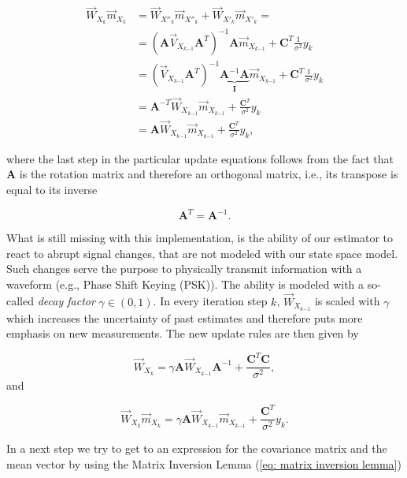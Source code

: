 \documentclass[11pt,a4paper,twoside]{report}
\newcommand{\messF}[3]{\overrightarrow{#1}_{{#2}_{k{#3}}}}
\newcommand{\mat}[1]{\mathbf{#1}}
\begin{document}
\begin{align}
  \label{eq: weighted mean}
  \messF{W}{X}{}\messF{m}{X}{} &= \messF{W}{X''}{}\messF{m}{X''}{} + \messF{W}{X'}{}\messF{m}{X'}{} = \\
  &= \left(\mat{A}\messF{V}{X}{-1}\mat{A}^T\right)^{-1}\mat{A}\messF{m}{X}{-1} + \mat{C}^T\frac{1}{\sigma^2}y_k \\
  &= \left(\messF{V}{X}{-1}\mat{A}^T\right)^{-1}\underbrace{\mat{A}^{-1}\mat{A}}_{\mat{I}}\messF{m}{X}{-1} + \mat{C}^T\frac{1}{\sigma^2}y_k \\
  &= \mat{A}^{-T}\messF{W}{X}{-1}\messF{m}{X}{-1} + \frac{\mat{C}^T}{\sigma^2}y_k \\
  &= \mat{A}\messF{W}{X}{-1}\messF{m}{X}{-1} + \frac{\mat{C}^T}{\sigma^2}y_k,
\end{align}

where the last step in the particular update equations follows from the fact that $\mat{A}$ is the rotation matrix and therefore an orthogonal matrix, i.e., its transpose is equal to its inverse

\begin{equation*}
	\mat{A}^T = \mat{A}^{-1}.
\end{equation*}

What is still missing with this implementation, is the ability of our estimator to react to abrupt signal changes, that are not modeled with our state space model. Such changes serve the purpose to physically transmit information with a waveform (e.g., Phase Shift Keying (PSK)). The ability is modeled with a so-called \emph{decay factor} $\gamma \in (0,1)$. In every iteration step $k$, $\messF{W}{X}{-1}$ is scaled with $\gamma$ which increases the uncertainty of  past estimates and therefore puts more emphasis on new measurements. The new update rules are then given by


\begin{equation}
  \label{eq: decay precision matrix}
  \messF{W}{X}{} = \gamma \mat{A}\messF{W}{X}{-1}\mat{A}^{-1} + \frac{\mat{C}^T\mat{C}}{\sigma^2},
\end{equation} 
and

\begin{equation}
  \label{eq: decay weighted mean}
  \messF{W}{X}{}\messF{m}{X}{} = \gamma \mat{A}\messF{W}{X}{-1}\messF{m}{X}{-1} + \frac{\mat{C}^T}{\sigma^2}y_k.
\end{equation}


In a next step we try to get to an expression for the covariance matrix and the mean vector by using the Matrix Inversion Lemma (\ref{eq: matrix inversion lemma})
 
\end{document}
